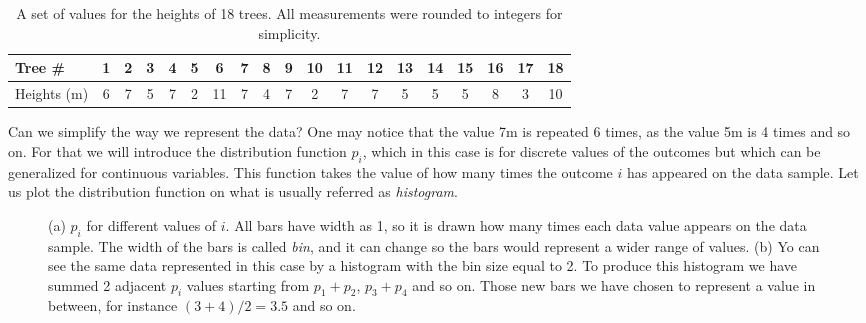 \begin{table}
\begin{center}
\begin{tabular}{| l | c | c | c | c | c | c | c | c | c | c | c | c | c | c | c | c | c | c | }
  \hline
  Tree \# & 1 & 2 & 3 & 4 & 5 & 6 & 7 & 8 & 9 & 10 &  11 &  12 &  13 &  14 &  15 &  16 &  17 &  18
  \\ \hline
  Heights (m) & 6 &  7 &  5 &  7 &  2 & 11 &  7 &  4 &  7 &  2 &  7 &  7 &  5 &  5 &  5 &  8 &  3 & 10 \\ \hline
\end{tabular}
\end{center}
\caption{A set of values for the heights of 18 trees. All measurements were rounded to integers for simplicity.}
\end{table}

Can we simplify the way we represent the data?
One may notice that the value 7m is repeated 6 times, as the value 5m is 4 times and so on.
For that we will introduce the distribution function $p_i$, which in this case is for discrete values of the outcomes but which can be generalized for continuous variables.
This function takes the value of how many times the outcome $i$ has appeared on the data sample.
Let us plot the distribution function on what is usually referred as \emph{histogram}.

\begin{figure}
  \centering
  \hfill
  \caption{(a) $p_i$ for different values of $i$. All bars have width as 1, so it is drawn how many times each data value appears on the data sample.
  The width of the bars is called \emph{bin}, and it can change so the bars would represent a wider range of values. (b) Yo can see the same data represented in this case by a histogram with the bin size equal to 2. To produce this histogram we have summed 2 adjacent $p_i$ values starting from $p_1+p_2$, $p_3+p_4$ and so on.
  Those new bars we have chosen to represent a value in between, for instance $(3+4)/2=3.5$ and so on.}
\end{figure}

